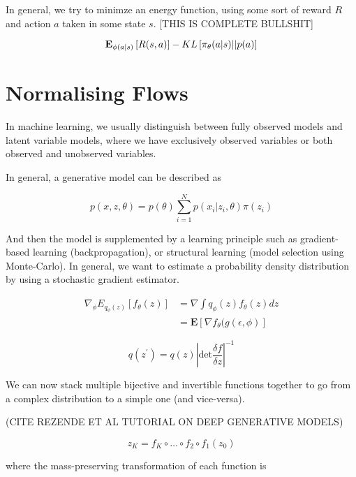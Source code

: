 \documentclass[a4paper,12pt,twoside,openright]{report}
\begin{document}
In general, we try to minimze an energy function, using some sort of reward $R$ and action $a$ taken in some state $s$. 
[THIS IS COMPLETE BULLSHIT]

\begin{equation}
\mathbf{E}_{\phi(a|s)} \left[R(s, a)\right] - KL \left[\pi_\theta(a|s) || p(a)\right]
\end{equation}

\section{Normalising Flows}

In machine learning, we usually distinguish between fully observed models and latent variable models, where we have exclusively observed variables or both observed and unobserved variables.

In general, a generative model can be described as 

\begin{equation}
p(x, z, \theta) = p(\theta) \sum_{i=1}^N p(x_i | z_i, \theta) \pi(z_i)
\end{equation}

And then the model is supplemented by a learning principle such as gradient-based learning (backpropagation), or structural learning (model selection using Monte-Carlo).
In general, we want to estimate a probability density distribution by using a stochastic gradient estimator.

\begin{align}
\nabla_\phi E_{q_\phi(z)}  \left[ f_\theta(z) \right] &= \nabla \int q_\phi(z) f_\theta(z)dz \\
&= \mathbf{E} \left[ \nabla f_\theta (g( \epsilon, \phi ) \right]
\end{align}

\begin{equation}
q(z^\prime) = q(z) \left| \text{det} \frac{\delta f}{\delta z} \right|^{-1}
\end{equation}

We can now stack multiple bijective and invertible functions together to go from a complex distribution to a simple one (and vice-versa).

(CITE REZENDE ET AL TUTORIAL ON DEEP GENERATIVE MODELS)

\begin{equation}
z_K = f_K \circ \ldots \circ f_2 \circ f_1(z_0)
\end{equation}

where the mass-preserving transformation of each function is
\end{document}
